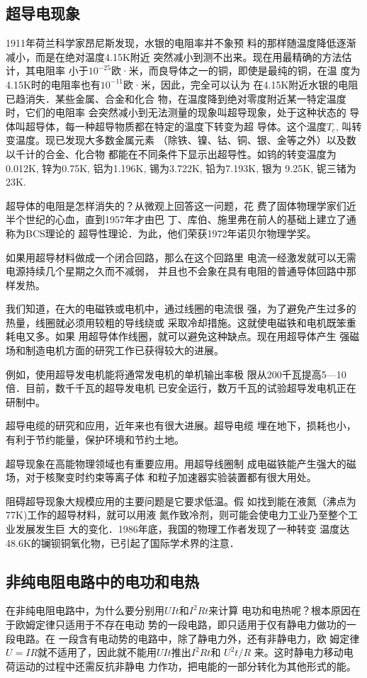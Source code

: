 \subsection{超导电现象}
1911年荷兰科学家昂尼斯发现，水银的电阻率并不象预
料的那样随温度降低逐渐减小，而是在绝对温度4.15K附近
突然减小到测不出来。现在用最精确的方法估计，其电阻率
小于$10^{-25}$欧·米，而良导体之一的铜，即使是最纯的铜，在温
度为4.15K时的电阻率也有$10^{-11}$欧·米，因此，完全可以认为
在4.15K附近水银的电阻已趋消失．某些金属、合金和化合
物，在温度降到绝对零度附近某一特定温度时，它们的电阻率
会突然减小到无法测量的现象叫超导现象，处于这种状态的
导体叫超导体，每一种超导物质都在特定的温度下转变为超
导体。这个温度$T_c$, 叫转变温度。现已发现大多数金属元素
（除铁、镍、钴、铜、银、金等之外）以及数以千计的合金、化合物
都能在不同条件下显示出超导性。如钨的转变温度为0.012K,
锌为0.75K, 铝为1.196K, 锡为3.722K, 铅为7.193K, 银为
9.25K, 铌三锗为23K.

超导体的电阻是怎样消失的？从微观上回答这一问题，花
费了固体物理学家们近半个世纪的心血，直到1957年才由巴
丁、库伯、施里弗在前人的基础上建立了通称为BCS理论的
超导性理论．为此，他们荣获1972年诺贝尔物理学奖。

如果用超导材料做成一个闭合回路，那么在这个回路里
电流一经激发就可以无需电源持续几个星期之久而不减弱，
并且也不会象在具有电阻的普通导体回路中那样发热。

我们知道，在大的电磁铁或电机中，通过线圈的电流很
强，为了避免产生过多的热量，线圈就必须用较粗的导线绕或
采取冷却措施。这就使电磁铁和电机既笨重耗电又多。如果
用超导体作线圈，就可以避免这种缺点。现在用超导体产生
强磁场和制造电机方面的研究工作已获得较大的进展。

例如，使用超导发电机能将通常发电机的单机输出率极
限从200千瓦提高5—10倍．目前，数千千瓦的超导发电机
已安全运行，数万千瓦的试验超导发电机正在研制中。

超导电缆的研究和应用，近年来也有很大进展。超导电缆
埋在地下，损耗也小，有利于节约能量，保护环境和节约土地。

超导现象在高能物理领域也有重要应用。用超导线圈制
成电磁铁能产生强大的磁场，对于核聚变时约束等离子体
和粒子加速器实验装置都有很大用处。

阻碍超导现象大规模应用的主要问题是它要求低温。假
如找到能在液氮（沸点为77K)工作的超导材料，就可以用液
氮作致冷剂，则可能会使电力工业乃至整个工业发展发生巨
大的变化．1986年底，我国的物理工作者发现了一种转变
温度达48.6K的镧钡铜氧化物，已引起了国际学术界的注意．

\subsection{非纯电阻电路中的电功和电热}
在非纯电阻电路中，为什么要分别用$UIt$和$I^2Rt$来计算
电功和电热呢？根本原因在于欧姆定律只适用于不存在电动
势的一段电路，即只适用于仅有静电力做功的一段电路。在
一段含有电动势的电路中，除了静电力外，还有非静电力，欧
姆定律$U=IR$就不适用了，因此就不能用$UIt$推出$I^2Rt$和
$U^2t/R$
来。这时静电力移动电荷运动的过程中还需反抗非静电
力作功，把电能的一部分转化为其他形式的能。

